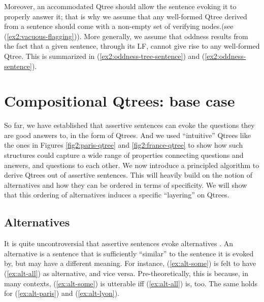 Moreover, an accommodated Qtree should allow the sentence evoking it to properly answer it; that is why we assume that any well-formed Qtree derived from a sentence should come with a non-empty set of verifying nodes.(see (\ref{ex2:vacuous-flagging})). More generally, we assume that oddness results from the fact that a given sentence, through its LF, cannot give rise to any well-formed Qtree. This is summarized in (\ref{ex2:oddness-tree-sentence}) and (\ref{ex2:oddness-sentence}).


\begin{exe}
	\label{ex2:vacuous-flagging}
	\label{ex2:oddness-tree-sentence}
	\label{ex2:oddness-sentence}
\end{exe}



\section{Compositional Qtrees: base case}\label{sec:simplex}

So far, we have established that assertive sentences can evoke the questions they are good answers to, in the form of Qtrees. And we used ``intuitive'' Qtrees like the ones in Figures \ref{fig2:paris-qtree} and \ref{fig2:france-qtree} to show how such structures could capture a wide range of properties connecting questions and answers, and questions to each other. We now introduce a principled algorithm to derive Qtrees out of assertive sentences. This will heavily build on the notion of alternatives and how they can be ordered in terms of specificity. We will show that this ordering of alternatives induces a specific ``layering'' on Qtrees.

\subsection{Alternatives}

It is quite uncontroversial that assertive sentences evoke alternatives \citep{Rooth1992,Katzir2007,Fox2011}. An alternative is a sentence that is sufficiently ``similar'' to the sentence it is evoked by, but may have a different meaning. For instance, (\ref{ex:alt-some}) is felt to have (\ref{ex:alt-all}) as alternative, and vice versa. Pre-theoretically, this is because, in many contexts, (\ref{ex:alt-some}) is utterable iff (\ref{ex:alt-all}) is, too. The same holds for (\ref{ex:alt-paris}) and (\ref{ex:alt-lyon}).

